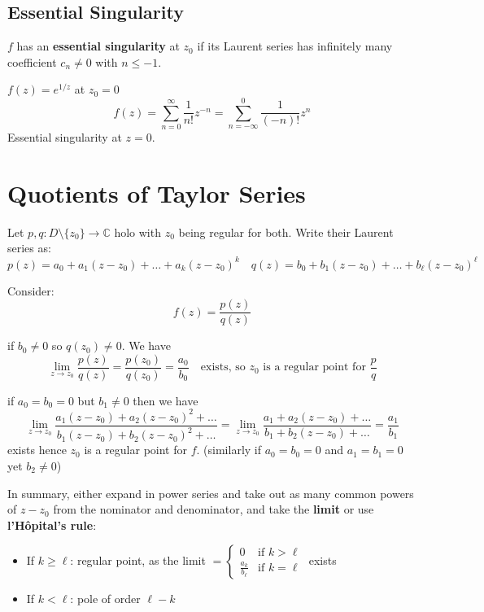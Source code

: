\subsection{Essential Singularity}

\begin{definition}
$f$ has an \textbf{essential singularity} at $z_0$ if its Laurent series has infinitely many coefficient $c_n \neq 0$ with $n \leq -1$.
\end{definition}

\begin{example}

$f(z) = e^{1/z}$ at $z_0 = 0$ 
\[
f(z) = \sum_{n=0}^{\infty} \frac{1}{n!} z^{-n} = \sum_{n= -\infty}^{0}\frac{1}{(-n)!}z^n 
\]
Essential singularity at $z=0$.
\end{example}

\section{Quotients of Taylor Series}

Let $p, q: D \setminus \{z_0\} \to \mathbb{C}$ holo with $z_0$ being regular for both. Write their Laurent series as:
\[
p(z) = a_0 + a_1(z-z_0) + \dots + a_k (z-z_0)^k
\quad
q(z) = b_0 + b_1(z-z_0) + \dots + b_\ell (z-z_0)^\ell
\]

Consider:
\[
f(z) = \frac{p(z)}{q(z)}
\]

if $b_0 \neq 0$ so $q(z_0) \neq 0$. We have \[
  \lim_{z \to z_0}\frac{p(z)}{q(z)} = \frac{p(z_0)}{q(z_0)} = \frac{a_0}{b_0} \quad \text{exists, so } z_0 \text{ is a regular point for } \frac{p}{q}
\] 

if $a_0 = b_0 = 0$ but $b_1 \neq 0$ then we have \[
  \lim_{z \to z_0} \frac{a_1(z - z_0) + a_2(z-z_0)^2 + \dots}{b_1(z-z_0) + b_2(z-z_0)^2 + \dots} = \lim_{z \to z_0} \frac{a_1 + a_2(z-z_0) + \dots}{b_1 + b_2(z-z_0) + \dots} = \frac{a_1}{b_1}
\]exists hence $z_0$ is a regular point for $f$. (similarly if $a_0 = b_0 = 0$ and $a_1 = b_1 = 0$ yet $b_2 \neq  0$) 

In summary, either expand in power series and take out as many common powers of $z-z_0$ from the nominator and denominator, and take the \textbf{limit} or use \textbf{l'Hôpital's rule}:

\begin{itemize}
\item If $k \ge \ell$: regular point, as the limit $= \begin{cases}
    0 & \text{if } k>\ell \\
    \frac{a_k}{b_\ell} & \text{if } k=\ell
  \end{cases}$ exists 
\item If $k < \ell$: pole of order $\ell - k$
\end{itemize}

